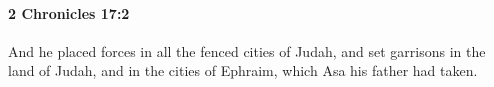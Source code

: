 
		\paragraph{2 Chronicles 17:2} %
			\label{2CHRONICLES-17-2}

			And he placed forces in all the fenced cities of Judah, and set garrisons in the land of Judah, and in the cities of Ephraim, which Asa his father had taken.


